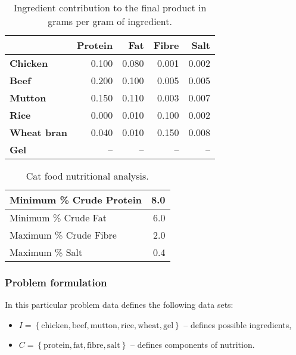 \begin{table}
  \centering
  \begin{tabular}{| l | r | r | r | r |}
    \hline
    & \textbf{Protein} & \textbf{Fat} & \textbf{Fibre} & \textbf{Salt} \\ \hline
    \textbf{Chicken} & 0.100 & 0.080 & 0.001 & 0.002 \\ \hline
    \textbf{Beef} & 0.200 & 0.100 & 0.005 & 0.005 \\ \hline
    \textbf{Mutton} & 0.150 & 0.110 & 0.003 & 0.007 \\ \hline
    \textbf{Rice} & 0.000 & 0.010 & 0.100 & 0.002 \\ \hline
    \textbf{Wheat bran} & 0.040 & 0.010 & 0.150 & 0.008 \\ \hline
    \textbf{Gel} & -- & -- & -- & -- \\ \hline
  \end{tabular}
  \caption{Ingredient contribution to the final product in grams per gram of ingredient.}
  \label{ampl:whiskas:contribution}  
\end{table}

\begin{table}
  \centering
  \begin{tabular}{| l | r |}
    \hline
    Minimum \% Crude Protein & 8.0 \\ \hline
    Minimum \% Crude Fat & 6.0 \\ \hline
    Maximum \% Crude Fibre & 2.0 \\ \hline
    Maximum \% Salt & 0.4 \\ \hline
  \end{tabular}
  \caption{Cat food nutritional analysis.}
  \label{ampl:whiskas:analysis}  
\end{table}


  
\subsubsection{Problem formulation}

In this particular problem data defines the following data sets:

\begin{itemize}
  \item $I = \left\{\text{chicken}, \text{beef}, \text{mutton}, \text{rice}, \text{wheat}, \text{gel}\right\}$ -- defines possible ingredients,
  \item $C = \left\{\text{protein}, \text{fat}, \text{fibre}, \text{salt}\right\}$ -- defines components of nutrition.
\end{itemize}


